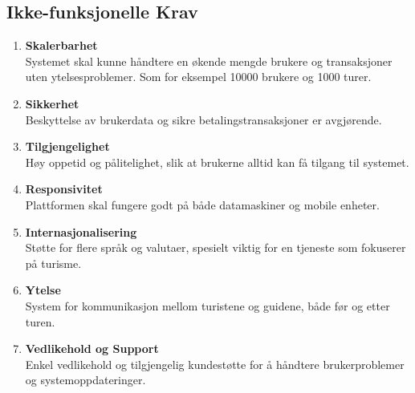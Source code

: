 \documentclass[../doc.tex]{subfiles}
\begin{document}
\subsection{Ikke-funksjonelle Krav}
\begin{enumerate}
    \item \textbf{Skalerbarhet} \\
    Systemet skal kunne håndtere en økende mengde brukere og transaksjoner uten ytelsesproblemer. Som for eksempel 10000 brukere og 1000 turer.

    \item \textbf{Sikkerhet} \\
    Beskyttelse av brukerdata og sikre betalingstransaksjoner er avgjørende.

    \item \textbf{Tilgjengelighet} \\ 
    Høy oppetid og pålitelighet, slik at brukerne alltid kan få tilgang til systemet.

    \item \textbf{Responsivitet} \\
    Plattformen skal fungere godt på både datamaskiner og mobile enheter.

    \item \textbf{Internasjonalisering} \\
    Støtte for flere språk og valutaer, spesielt viktig for en tjeneste som fokuserer på turisme.

    \item \textbf{Ytelse} \\
    System for kommunikasjon mellom turistene og guidene, både før og etter turen.

    \item \textbf{Vedlikehold og Support} \\
    Enkel vedlikehold og tilgjengelig kundestøtte for å håndtere brukerproblemer og systemoppdateringer.
\end{enumerate}
\end{document}
